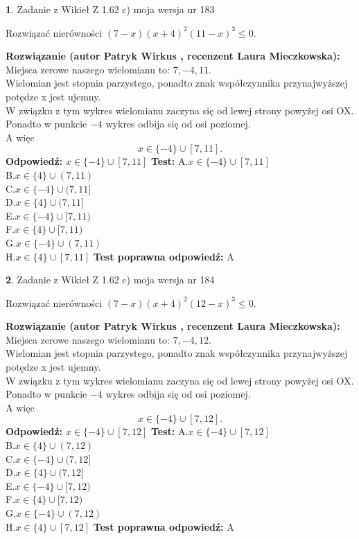 \documentclass[12pt, a4paper]{article}
\theoremstyle{definition} %
\newtheorem{zad}{}
\newcommand{\zadStart}[1]{\begin{zad}#1\newline}
\newcommand{\zadStop}{\end{zad}}
\newcommand{\rozwStart}[2]{\noindent \textbf{Rozwiązanie (autor #1 , recenzent #2): }\newline}
\newcommand{\rozwStop}{\newline}
\newcommand{\odpStart}{\noindent \textbf{Odpowiedź:}\newline}
\newcommand{\odpStop}{\newline}
\newcommand{\testStart}{\noindent \textbf{Test:}\newline}
\newcommand{\testStop}{\newline}
\newcommand{\kluczStart}{\noindent \textbf{Test poprawna odpowiedź:}\newline}
\newcommand{\kluczStop}{\newline}
\begin{document}
\zadStart{Zadanie z Wikieł Z 1.62 c) moja wersja nr 183}

Rozwiązać nierówności $(7-x)(x+4)^{2}(11-x)^{3}\le0$.
\zadStop
\rozwStart{Patryk Wirkus}{Laura Mieczkowska}
Miejsca zerowe naszego wielomianu to: $7, -4, 11$.\\
Wielomian jest stopnia parzystego, ponadto znak współczynnika przy\linebreak najwyższej potędze x jest ujemny.\\ W związku z tym wykres wielomianu zaczyna się od lewej strony powyżej osi OX.\\
Ponadto w punkcie $-4$ wykres odbija się od osi poziomej.\\
A więc $$x \in \{-4\} \cup [7,11].$$
\rozwStop
\odpStart
$x \in \{-4\} \cup [7,11]$
\odpStop
\testStart
A.$x \in \{-4\} \cup [7,11]$\\
B.$x \in \{4\} \cup (7,11)$\\
C.$x \in \{-4\} \cup (7,11]$\\
D.$x \in \{4\} \cup (7,11]$\\
E.$x \in \{-4\} \cup [7,11)$\\
F.$x \in \{4\} \cup [7,11)$\\
G.$x \in \{-4\} \cup (7,11)$\\
H.$x \in \{4\} \cup [7,11]$
\testStop
\kluczStart
A
\kluczStop



\zadStart{Zadanie z Wikieł Z 1.62 c) moja wersja nr 184}

Rozwiązać nierówności $(7-x)(x+4)^{2}(12-x)^{3}\le0$.
\zadStop
\rozwStart{Patryk Wirkus}{Laura Mieczkowska}
Miejsca zerowe naszego wielomianu to: $7, -4, 12$.\\
Wielomian jest stopnia parzystego, ponadto znak współczynnika przy\linebreak najwyższej potędze x jest ujemny.\\ W związku z tym wykres wielomianu zaczyna się od lewej strony powyżej osi OX.\\
Ponadto w punkcie $-4$ wykres odbija się od osi poziomej.\\
A więc $$x \in \{-4\} \cup [7,12].$$
\rozwStop
\odpStart
$x \in \{-4\} \cup [7,12]$
\odpStop
\testStart
A.$x \in \{-4\} \cup [7,12]$\\
B.$x \in \{4\} \cup (7,12)$\\
C.$x \in \{-4\} \cup (7,12]$\\
D.$x \in \{4\} \cup (7,12]$\\
E.$x \in \{-4\} \cup [7,12)$\\
F.$x \in \{4\} \cup [7,12)$\\
G.$x \in \{-4\} \cup (7,12)$\\
H.$x \in \{4\} \cup [7,12]$
\testStop
\kluczStart
A
\kluczStop
\end{document}
